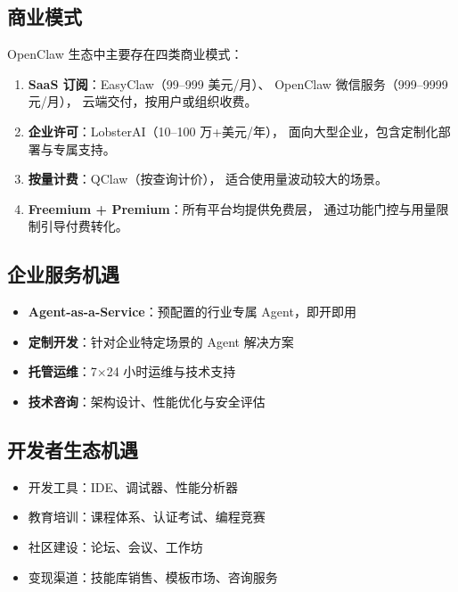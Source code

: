 \documentclass[
  customlatinfont = macos,
]{hkustthesis}
\begin{document}
\subsection{商业模式}

OpenClaw 生态中主要存在四类商业模式：

\begin{enumerate}[nosep]
  \item \textbf{SaaS 订阅}：EasyClaw（99--999 美元/月）、
        OpenClaw 微信服务（999--9999 元/月），
        云端交付，按用户或组织收费。
  \item \textbf{企业许可}：LobsterAI（10--100 万+美元/年），
        面向大型企业，包含定制化部署与专属支持。
  \item \textbf{按量计费}：QClaw（按查询计价），
        适合使用量波动较大的场景。
  \item \textbf{Freemium + Premium}：所有平台均提供免费层，
        通过功能门控与用量限制引导付费转化。
\end{enumerate}

\subsection{企业服务机遇}

\begin{itemize}[nosep]
  \item \textbf{Agent-as-a-Service}：预配置的行业专属 Agent，即开即用
  \item \textbf{定制开发}：针对企业特定场景的 Agent 解决方案
  \item \textbf{托管运维}：7$\times$24 小时运维与技术支持
  \item \textbf{技术咨询}：架构设计、性能优化与安全评估
\end{itemize}

\subsection{开发者生态机遇}

\begin{itemize}[nosep]
  \item 开发工具：IDE、调试器、性能分析器
  \item 教育培训：课程体系、认证考试、编程竞赛
  \item 社区建设：论坛、会议、工作坊
  \item 变现渠道：技能库销售、模板市场、咨询服务
\end{itemize}


\end{document}
